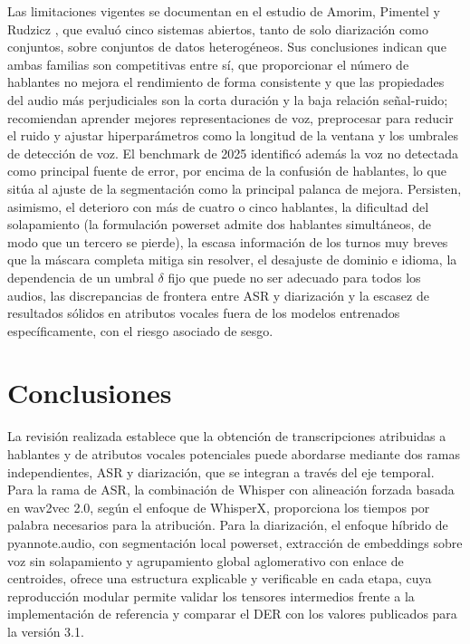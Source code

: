 \documentclass[11pt,a4paper]{article}
\begin{document}
Las limitaciones vigentes se documentan en el estudio de Amorim, Pimentel y Rudzicz \cite{amorim2026}, que evaluó cinco sistemas abiertos, tanto de solo diarización como conjuntos, sobre conjuntos de datos heterogéneos. Sus conclusiones indican que ambas familias son competitivas entre sí, que proporcionar el número de hablantes no mejora el rendimiento de forma consistente y que las propiedades del audio más perjudiciales son la corta duración y la baja relación señal-ruido; recomiendan aprender mejores representaciones de voz, preprocesar para reducir el ruido y ajustar hiperparámetros como la longitud de la ventana y los umbrales de detección de voz. El benchmark de 2025 \cite{benchmark2025} identificó además la voz no detectada como principal fuente de error, por encima de la confusión de hablantes, lo que sitúa al ajuste de la segmentación como la principal palanca de mejora. Persisten, asimismo, el deterioro con más de cuatro o cinco hablantes, la dificultad del solapamiento (la formulación powerset admite dos hablantes simultáneos, de modo que un tercero se pierde), la escasa información de los turnos muy breves que la máscara completa mitiga sin resolver, el desajuste de dominio e idioma, la dependencia de un umbral $\delta$ fijo que puede no ser adecuado para todos los audios, las discrepancias de frontera entre ASR y diarización y la escasez de resultados sólidos en atributos vocales fuera de los modelos entrenados específicamente, con el riesgo asociado de sesgo.

\section*{Conclusiones}

La revisión realizada establece que la obtención de transcripciones atribuidas a hablantes y de atributos vocales potenciales puede abordarse mediante dos ramas independientes, ASR y diarización, que se integran a través del eje temporal. Para la rama de ASR, la combinación de Whisper con alineación forzada basada en wav2vec 2.0, según el enfoque de WhisperX, proporciona los tiempos por palabra necesarios para la atribución. Para la diarización, el enfoque híbrido de pyannote.audio, con segmentación local powerset, extracción de embeddings sobre voz sin solapamiento y agrupamiento global aglomerativo con enlace de centroides, ofrece una estructura explicable y verificable en cada etapa, cuya reproducción modular permite validar los tensores intermedios frente a la implementación de referencia y comparar el DER con los valores publicados para la versión 3.1.
\end{document}
